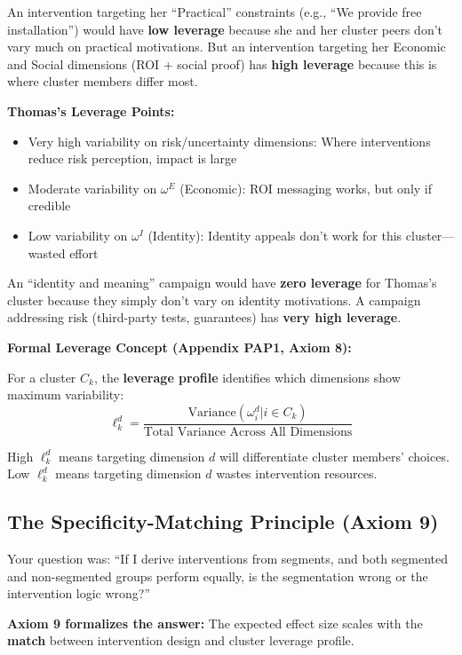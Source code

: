 An intervention targeting her ``Practical'' constraints (e.g., ``We provide free installation'')
would have \textbf{low leverage} because she and her cluster peers don't vary much on practical
motivations. But an intervention targeting her Economic and Social dimensions (ROI + social proof)
has \textbf{high leverage} because this is where cluster members differ most.

\textbf{Thomas's Leverage Points:}
\begin{itemize}[nosep]
\item Very high variability on risk/uncertainty dimensions: Where interventions reduce risk perception, impact is large
\item Moderate variability on $\omega^E$ (Economic): ROI messaging works, but only if credible
\item Low variability on $\omega^I$ (Identity): Identity appeals don't work for this cluster---wasted effort
\end{itemize}

An ``identity and meaning'' campaign would have \textbf{zero leverage} for Thomas's cluster because
they simply don't vary on identity motivations. A campaign addressing risk (third-party tests, guarantees)
has \textbf{very high leverage}.

\textbf{Formal Leverage Concept (Appendix PAP1, Axiom 8):}

For a cluster $C_k$, the \textbf{leverage profile} identifies which dimensions show maximum variability:
\begin{equation}
\ell_k^d = \frac{\text{Variance}(\omega_i^d | i \in C_k)}{\text{Total Variance Across All Dimensions}}
\end{equation}

High $\ell_k^d$ means targeting dimension $d$ will differentiate cluster members' choices.
Low $\ell_k^d$ means targeting dimension $d$ wastes intervention resources.

\subsection{The Specificity-Matching Principle (Axiom 9)}

Your question was: ``If I derive interventions from segments, and both segmented and
non-segmented groups perform equally, is the segmentation wrong or the intervention
logic wrong?''

\textbf{Axiom 9 formalizes the answer:} The expected effect size scales with the
\textbf{match} between intervention design and cluster leverage profile.

